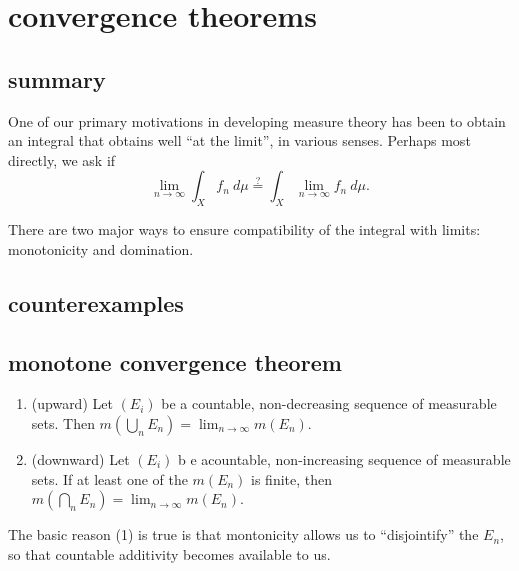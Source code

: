 \documentclass[12pt]{article}
\begin{document}


\section{convergence theorems} %

\subsection{summary} %

One of our primary motivations in developing measure theory has been to obtain an integral that obtains well ``at the limit'', in various senses. Perhaps most directly, we ask if 
\begin{equation*}
	\lim_{n\to\infty}\int_X f_n\ d\mu \overset{?}{=} \int_X\lim_{n\to\infty}f_n\ d\mu.
\end{equation*}

There are two major ways to ensure compatibility of the integral with limits: monotonicity and domination.


\subsection{counterexamples} %


\subsection{monotone convergence theorem} %

\begin{theorem}
	\hfill
	\begin{enumerate}
		\item (upward) Let $(E_i)$ be a countable, non-decreasing sequence of measurable sets. Then $m(\bigcup_n E_n)=\lim_{n\to\infty} m(E_n)$.
		\item (downward) Let $(E_i)$ b e acountable, non-increasing sequence of measurable sets. If at least one of the $m(E_n)$ is finite, then $m(\bigcap_n E_n)=\lim_{n\to\infty}m(E_n)$. 
	\end{enumerate}
\end{theorem}

\begin{remark}[]
	The basic reason (1) is true is that montonicity allows us to ``disjointify'' the $E_n$, so that countable additivity becomes available to us.
\end{remark}
\end{document}
